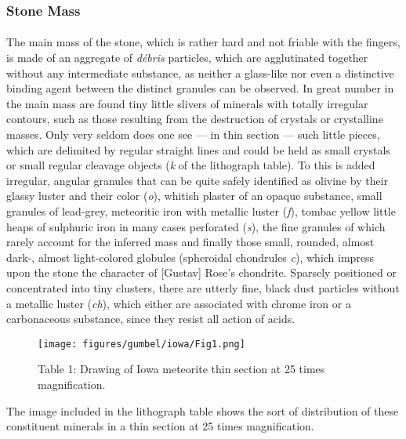 \documentclass[a4paper, 12pt, oneside]{article}
\begin{document}
\subsubsection{Stone Mass}
\paragraph*{}
The main mass of the stone, which is rather hard and not friable with the fingers, is made of an aggregate of \emph{débris} particles, which are agglutinated together without any intermediate substance, as neither a glass-like nor even a distinctive binding agent between the distinct granules can be observed. In great number in the main mass are found tiny little slivers of minerals with totally irregular contours, such as those resulting from the destruction of crystals or crystalline masses. Only very seldom does one see --- in thin section --- such little pieces, which are delimited by regular straight lines and could be held as small crystals or small regular cleavage objects (\emph{k} of the lithograph table). To this is added irregular, angular granules that can be quite safely identified as olivine by their glassy luster and their color (\emph{o}), whitish plaster of an opaque substance, small granules of lead-grey, meteoritic iron with metallic luster (\emph{f}), tombac yellow little heaps of sulphuric iron in many cases perforated (\emph{s}), the fine granules of which rarely account for the inferred mass and finally those small, rounded, almost dark-, almost light-colored globules (spheroidal chondrules \emph{c}), which impress upon the stone the character of [Gustav] Rose's chondrite. Sparsely positioned or concentrated into tiny clusters, there are utterly fine, black dust particles without a metallic luster (\emph{ch}), which either are associated with chrome iron or a carbonaceous substance, since they resist all action of acids.
\clearpage
\begin{figure}[t]
\centering
\texttt{[image: figures/gumbel/iowa/Fig1.png]}
\caption{Table 1: Drawing of Iowa meteorite thin section at 25 times magnification.}
\end{figure}
The image included in the lithograph table shows the sort of distribution of these constituent minerals in a thin section at 25 times magnification.
\end{document}
